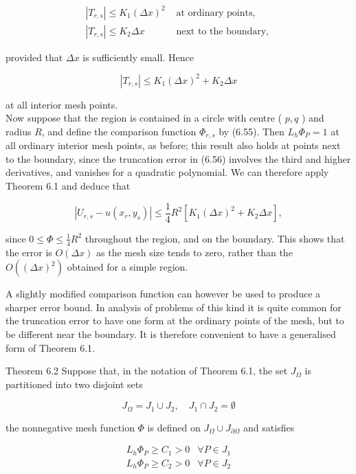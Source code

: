 \documentclass[10pt]{article}
\begin{document}
\[
\begin{array}{ll}
\left|T_{r, s}\right| \leq K_{1}(\Delta x)^{2} & \text { at ordinary points, } \\
\left|T_{r, s}\right| \leq K_{2} \Delta x & \text { next to the boundary, }
\end{array}
\]

provided that \(\Delta x\) is sufficiently small. Hence

\[
\left|T_{r, s}\right| \leq K_{1}(\Delta x)^{2}+K_{2} \Delta x
\]

at all interior mesh points.\\
Now suppose that the region is contained in a circle with centre ( \(p, q\) ) and radius \(R\), and define the comparison function \(\Phi_{r, s}\) by (6.55). Then \(L_{h} \Phi_{P}=1\) at all ordinary interior mesh points, as before; this result also holds at points next to the boundary, since the truncation error in (6.56) involves the third and higher derivatives, and vanishes for a quadratic polynomial. We can therefore apply Theorem 6.1 and deduce that

\[
\left|U_{r, s}-u\left(x_{r}, y_{s}\right)\right| \leq \frac{1}{4} R^{2}\left[K_{1}(\Delta x)^{2}+K_{2} \Delta x\right],
\]

since \(0 \leq \Phi \leq \frac{1}{4} R^{2}\) throughout the region, and on the boundary. This shows that the error is \(O(\Delta x)\) as the mesh size tends to zero, rather than the \(O\left((\Delta x)^{2}\right)\) obtained for a simple region.

A slightly modified comparison function can however be used to produce a sharper error bound. In analysis of problems of this kind it is quite common for the truncation error to have one form at the ordinary points of the mesh, but to be different near the boundary. It is therefore convenient to have a generalised form of Theorem 6.1.

Theorem 6.2 Suppose that, in the notation of Theorem 6.1, the set \(J_{\Omega}\) is partitioned into two disjoint sets

\[
J_{\Omega}=J_{1} \cup J_{2}, \quad J_{1} \cap J_{2}=\emptyset
\]

the nonnegative mesh function \(\Phi\) is defined on \(J_{\Omega} \cup J_{\partial \Omega}\) and satisfies

\[
\begin{array}{ll}
L_{h} \Phi_{P} \geq C_{1}>0 & \forall P \in J_{1} \\
L_{h} \Phi_{P} \geq C_{2}>0 & \forall P \in J_{2}
\end{array}
\]
\end{document}
